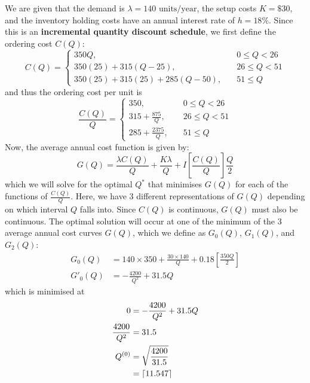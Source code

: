 \documentclass[12pt]{article}
\begin{document}
We are given that the demand is $\lambda = 140 \text{ units}/ \text{year}$, the setup costs $K = \$ 30$, and the inventory holding costs have an annual interest rate of $h = 18\%$. Since this is an \textbf{incremental quantity discount schedule}, we first define the ordering cost $C(Q)$: \begin{equation*}
    C(Q) = \begin{cases}
        350Q, \quad & 0\leq Q < 26 \\ 
        350(25) + 315(Q-25), \quad & 26\leq Q < 51 \\ 
        350(25) + 315(25) + 285(Q-50), \quad & 51 \leq Q 
    \end{cases}
\end{equation*} and thus the ordering cost per unit is \begin{equation}\label{eq:5-ineq}
    \frac{C(Q)}{Q}  = \begin{cases}
        350, \quad & 0\leq Q < 26 \\ 
        315 + \frac{875}{Q}, \quad & 26\leq Q < 51 \\ 
        285 + \frac{2375}{Q}, \quad & 51 \leq Q 
    \end{cases}
\end{equation} Now, the average annual cost function is given by: \begin{equation}
    G(Q) = \frac{\lambda C(Q)}{Q} + \frac{K\lambda}{Q} + I\left[ \frac{C(Q)}{Q} \right] \frac{Q}{2}
\end{equation} which we will solve for the optimal $Q^{*}$ that minimises $G(Q)$ for each of the functions of $ \frac{C(Q)}{Q}$. Here, we have 3 different representations of $G(Q)$ depending on which interval $Q$ falls into. Since $C(Q)$ is continuous, $G(Q)$ must also be continuous. The optimal solution will occur at one of the minimum of the 3 average annual cost curves $G(Q)$, which we define as $G_0(Q)$, $G_1(Q)$, and $G_2(Q)$: \begin{align*}
    G_0(Q) &= 140 \times 350 + \frac{30 \times 140}{Q} + 0.18\left[ \frac{350Q}{2} \right] \\ 
    G'_0(Q) &= - \frac{4200}{Q^{2}} + 31.5Q 
\end{align*} which is minimised at \begin{align*}
    0 &= - \frac{4200}{Q^{2}} + 31.5Q \\
    \frac{4200}{Q^{2}} &= 31.5 \\ 
    Q^{(0)} &= \sqrt{\frac{4200}{31.5}} \\ 
    &= \ceil{11.547} \\ 

\end{align*}
\end{document}
